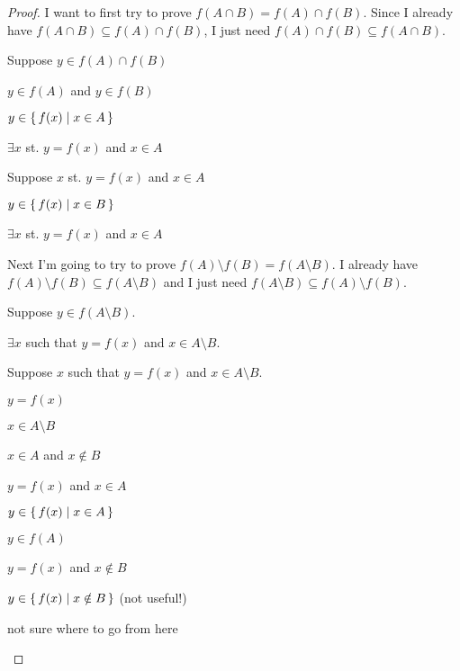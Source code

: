 \documentclass[../../main.tex]{subfiles}
\begin{document}
\begin{q}
    \begin{ans}
    
    \end{ans}
    \begin{proof}
        I want to first try to prove $f(A \cap B) = f(A) \cap f(B)$. Since I already have $f(A \cap B) \subseteq f(A) \cap f(B)$, I just need $f(A) \cap f(B) \subseteq f(A \cap B)$.
        
        \begin{lxl}
            \item Suppose $y \in f(A) \cap f(B)$
            \item $y \in f(A)$ and $y \in f(B)$
            \item $y \in \{\,f(x)\mid x \in A\,\}$
            \item $\exists x$ st. $y = f(x)$ and $x \in A$
            \item Suppose $x$ st. $y = f(x)$ and $x \in A$
            \item $y \in \{\,f(x)\mid x \in B\,\}$
            \item $\exists x$ st. $y = f(x)$ and $x \in A$
        \end{lxl}

        Next I'm going to try to prove $f(A) \setminus f(B) = f(A \setminus B)$. I already have $f(A) \setminus f(B) \subseteq f(A \setminus B)$ and I just need $f(A \setminus B) \subseteq f(A) \setminus f(B)$.
        \begin{lxl}
            \item Suppose $y \in f(A \setminus B)$.
            \item $\exists x$ such that $y=f(x)$ and $x \in A \setminus B$.
            \item Suppose $x$ such that $y=f(x)$ and $x \in A \setminus B$.
            \begin{lxl}
                \item $y=f(x)$
                \item $x \in A \setminus B$
                \item $x \in A$ and $x \notin B$
                \item $y=f(x)$ and $x \in A$
                \item $y \in \{\,f(x)\mid x \in A\,\}$
                \item $y \in f(A)$
                \item $y=f(x)$ and $x \notin B$
                \item \sout{$y \in \{\,f(x)\mid x \notin B\,\}$} (not useful!)
            \end{lxl}
        \end{lxl}
        \begin{xx}
            not sure where to go from here
        \end{xx}
    \end{proof}
\end{q}
\end{document}
